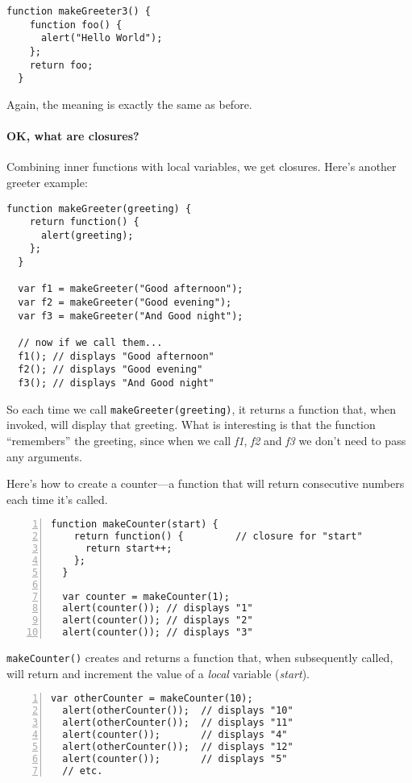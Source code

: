 \begin{lstlisting}[nolol]
  function makeGreeter3() {
    function foo() {
      alert("Hello World");
    };
    return foo;
  }
\end{lstlisting}

Again, the meaning is exactly the same as before.

\paragraph*{OK, what are closures?}

Combining inner functions with local variables, we get closures.  Here's
another greeter example:

\begin{lstlisting}[nolol]
  function makeGreeter(greeting) {
    return function() {
      alert(greeting);
    };
  }

  var f1 = makeGreeter("Good afternoon");
  var f2 = makeGreeter("Good evening");
  var f3 = makeGreeter("And Good night");

  // now if we call them...
  f1(); // displays "Good afternoon"
  f2(); // displays "Good evening"
  f3(); // displays "And Good night"
\end{lstlisting}

So each time we call \lstinline{makeGreeter(greeting)}, it returns a function
that, when invoked, will display that greeting.  What is interesting is that
the function “remembers” the greeting, since when we call \textit{f1},
\textit{f2} and \textit{f3} we don't need to pass any arguments.

Here's how to create a counter—a function that will return consecutive numbers
each time it's called.

\begin{lstlisting}[nolol,
    name=ClosureSample1,
    numbers=left,
    emph={[50]start},
    emphstyle={[50]\color{orange}},
  ]
  function makeCounter(start) {
    return function() {         // closure for "start"
      return start++;
    };
  }

  var counter = makeCounter(1);
  alert(counter()); // displays "1"
  alert(counter()); // displays "2"
  alert(counter()); // displays "3"
\end{lstlisting}

\lstinline{makeCounter()} creates and returns a function that, when
subsequently called, will return and increment the value of a \emph{local}
variable (\emph{start}).

\begin{lstlisting}[nolol,
    name=ClosureSample1,numbers=left
  ]
  var otherCounter = makeCounter(10);
  alert(otherCounter());  // displays "10"
  alert(otherCounter());  // displays "11"
  alert(counter());       // displays "4"
  alert(otherCounter());  // displays "12"
  alert(counter());       // displays "5"
  // etc.
\end{lstlisting}

